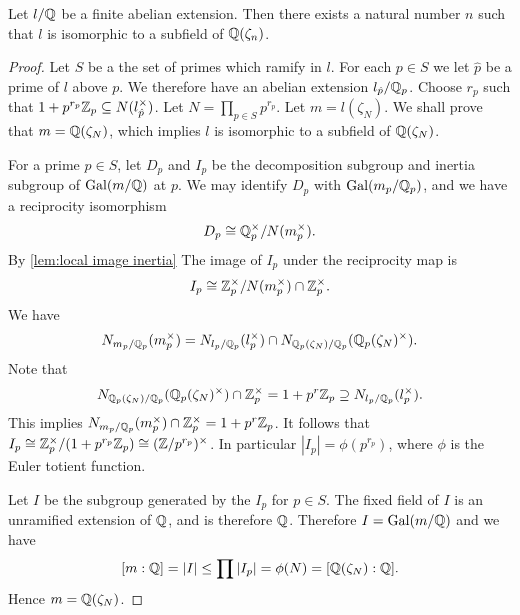 \begin{theorem} \label{thm:Kronecker Weber}
	Let $l/{\mathbb Q}$ be a finite abelian extension.
	Then there exists a natural number $n$ such that $l$ is isomorphic to
	a subfield of ${\mathbb Q}(\zeta_n)$.
\end{theorem}

\begin{proof}
	Let $S$ be a the set of primes which ramify in $l$.
	For each $p \in S$ we let $\hat p$ be a prime of $l$ above $p$.
	We therefore have an abelian extension $l_{\hat p} / {\mathbb Q}_p$.
	Choose $r_p$ such that $1+p^{r_p} {\mathbb Z}_p \subseteq N(l_{\hat p}^\times)$.
	Let $N = \prod_{p \in S} p^{r_p}$.
	Let $m = l(\zeta_N)$.
	We shall prove that $m = {\mathbb Q}(\zeta_N)$, which implies $l$ is
	isomorphic to a subfield of ${\mathbb Q}(\zeta_N)$.

	For a prime $p \in S$, let $D_p$ and $I_p$ be the decomposition subgroup and inertia subgroup of
	$\mathrm{Gal}(m/{\mathbb Q})$ at $p$. We may identify $D_p$ with $\mathrm{Gal}(m_p / {\mathbb Q}_p)$, and we have a reciprocity
	isomorphism
	\[
		D_p \cong {\mathbb Q}_p^\times / N(m_p^\times).
	\]
	By \ref{lem:local image inertia} The image of $I_p$ under the reciprocity map is
	\[
		I_p \cong {\mathbb Z}_p^\times / N(m_p^\times) \cap {\mathbb Z}_p^\times.
	\]
	We have
	\[
		N_{m_p/{\mathbb Q}_p} (m_p^\times)
		=
		N_{l_p/{\mathbb Q}_p} (l_p^\times) \cap N_{{\mathbb Q}_p(\zeta_N) / {\mathbb Q}_p} ({\mathbb Q}_p(\zeta_N)^\times).
	\]
	Note that
	\[
		N_{{\mathbb Q}_p(\zeta_N) / {\mathbb Q}_p} ({\mathbb Q}_p(\zeta_N)^\times) \cap {\mathbb Z}_p^\times =
		1+p^r {\mathbb Z}_p
		\supseteq N_{l_p/{\mathbb Q}_p} (l_p^\times).
	\]
	This implies $N_{m_p/{\mathbb Q}_p} (m_p^\times) \cap {\mathbb Z}_p^\times = 1+p^r {\mathbb Z}_p$.
	It follows that $I_p \cong {\mathbb Z}_p^\times / (1+p^{r_p} {\mathbb Z}_p) \cong ({\mathbb Z} / p^{r_p})^\times$.
	In particular $|I_p| = \phi(p^{r_p})$, where $\phi$ is the Euler totient function.

	Let $I$ be the subgroup generated by the $I_p$ for $p \in S$.
	The fixed field of $I$ is an unramified extension of ${\mathbb Q}$, and is therefore ${\mathbb Q}$.
	Therefore $I = \mathrm{Gal}(m/{\mathbb Q})$ and we have
	\[
		 [m : {\mathbb Q}] = |I| \le \prod |I_p| = \phi(N) = [{\mathbb Q}(\zeta_N) : {\mathbb Q}].
	\]
	Hence $m = {\mathbb Q}(\zeta_N)$.
\end{proof}
